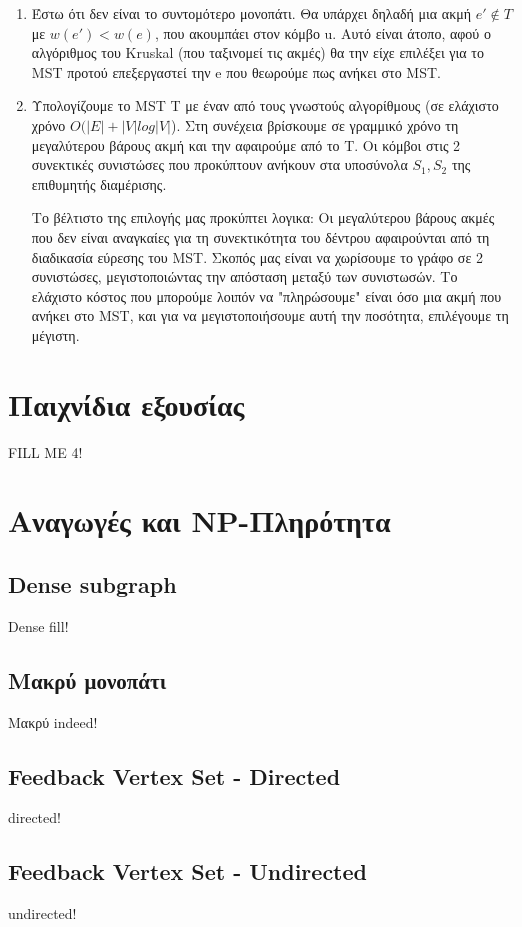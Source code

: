 \documentclass[a4paper,11pt]{article}
\begin{document}
\begin{enumerate}
\item Έστω ότι δεν είναι το συντομότερο μονοπάτι. Θα υπάρχει δηλαδή μια ακμή
$e' \notin T$ με $w(e') < w(e)$, που ακουμπάει στον κόμβο u. Αυτό είναι άτοπο,
αφού ο αλγόριθμος του Kruskal (που ταξινομεί τις ακμές) θα την είχε επιλέξει
για το MST προτού επεξεργαστεί την e που θεωρούμε πως ανήκει στο MST.
\item Υπολογίζουμε το MST T με έναν από τους γνωστούς αλγορίθμους (σε ελάχιστο
χρόνο $O(|E| + |V|log|V|$). Στη συνέχεια βρίσκουμε σε γραμμικό χρόνο τη
μεγαλύτερου βάρους ακμή και την αφαιρούμε από το T. Οι κόμβοι στις 2
συνεκτικές συνιστώσες που προκύπτουν ανήκουν στα υποσύνολα $S_1, S_2$ της
επιθυμητής διαμέρισης.

Το βέλτιστο της επιλογής μας προκύπτει λογικα: Οι μεγαλύτερου βάρους ακμές που
δεν είναι αναγκαίες για τη συνεκτικότητα του δέντρου αφαιρούνται από τη
διαδικασία εύρεσης του MST. Σκοπός μας είναι να χωρίσουμε το γράφο σε 2
συνιστώσες, μεγιστοποιώντας την απόσταση μεταξύ των συνιστωσών. Το ελάχιστο
κόστος που μπορούμε λοιπόν να "πληρώσουμε" είναι όσο μια ακμή που ανήκει στο
MST, και για να μεγιστοποιήσουμε αυτή την ποσότητα, επιλέγουμε τη μέγιστη.
\end{enumerate}


\section{Παιχνίδια εξουσίας}
FILL ME 4!


\section{Αναγωγές και NP-Πληρότητα}
\subsection{Dense subgraph}
Dense fill!
\subsection{Μακρύ μονοπάτι}
Μακρύ indeed!
\subsection{Feedback Vertex Set - Directed}
directed!
\subsection{Feedback Vertex Set - Undirected}
undirected!

\end{document}
